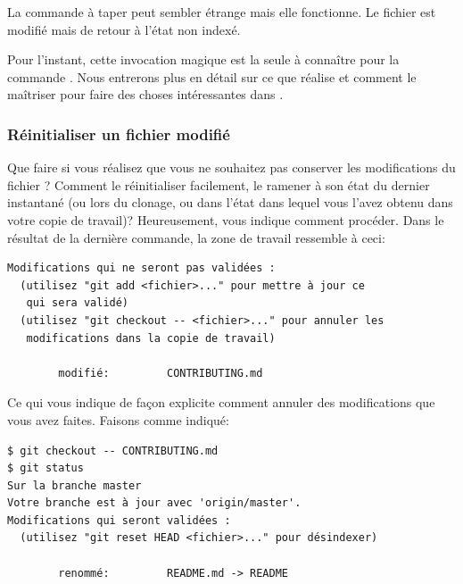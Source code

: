 La commande à taper peut sembler étrange mais elle fonctionne.
Le fichier  est modifié mais de retour à l'état non indexé.


Pour l'instant, cette invocation magique est la seule à connaître pour la commande .
Nous entrerons plus en détail sur ce que  réalise et comment le maîtriser pour faire des choses intéressantes dans .

\subsubsection{Réinitialiser un fichier modifié}

Que faire si vous réalisez que vous ne souhaitez pas conserver les modifications du fichier ?
Comment le réinitialiser facilement, le ramener à son état du dernier instantané (ou lors du clonage, ou dans l'état dans lequel vous l'avez obtenu dans votre copie de travail)?
Heureusement,  vous indique comment procéder.
Dans le résultat de la dernière commande, la zone de travail ressemble à ceci:
\begin{Schunk}
\begin{Verbatim}
Modifications qui ne seront pas validées :
  (utilisez "git add <fichier>..." pour mettre à jour ce
   qui sera validé)
  (utilisez "git checkout -- <fichier>..." pour annuler les
   modifications dans la copie de travail)

        modifié:         CONTRIBUTING.md
\end{Verbatim}
\end{Schunk}

Ce qui vous indique de façon explicite comment annuler des modifications que vous avez faites.
Faisons comme indiqué:
\begin{Schunk}
\begin{Verbatim}
$ git checkout -- CONTRIBUTING.md
$ git status
Sur la branche master
Votre branche est à jour avec 'origin/master'.
Modifications qui seront validées :
  (utilisez "git reset HEAD <fichier>..." pour désindexer)

        renommé:         README.md -> README
\end{Verbatim}
\end{Schunk}

